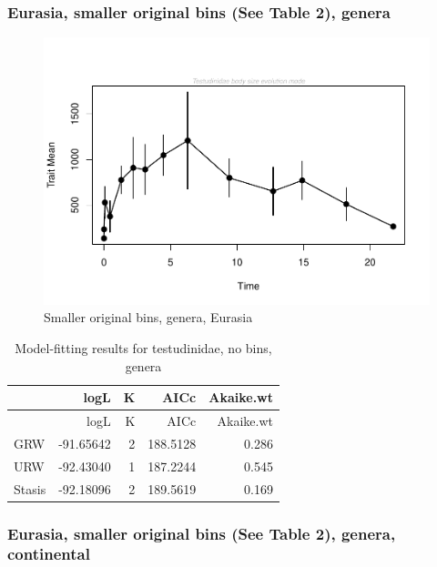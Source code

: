 \documentclass[]{article}
\begin{document}
\newpage 

\subsubsection{Eurasia, smaller original bins (See Table 2),
genera}\label{eurasia-smaller-original-bins-see-table-2-genera}

\begin{figure}[htbp]
\centering
\includegraphics{MA_JJ_files/figure-latex/paleoTS with different time bins, no bins, genera, Eurasia-1.pdf}
\caption{Smaller original bins, genera, Eurasia}
\end{figure}

\begin{longtable}[]{@{}lrrrr@{}}
\caption{Model-fitting results for testudinidae, no bins,
genera}\tabularnewline
\toprule
& logL & K & AICc & Akaike.wt\tabularnewline
\midrule
\endfirsthead
\toprule
& logL & K & AICc & Akaike.wt\tabularnewline
\midrule
\endhead
GRW & -91.65642 & 2 & 188.5128 & 0.286\tabularnewline
URW & -92.43040 & 1 & 187.2244 & 0.545\tabularnewline
Stasis & -92.18096 & 2 & 189.5619 & 0.169\tabularnewline
\bottomrule
\end{longtable}

\newpage 

\subsubsection{Eurasia, smaller original bins (See Table 2), genera,
continental}\label{eurasia-smaller-original-bins-see-table-2-genera-continental}
\end{document}
